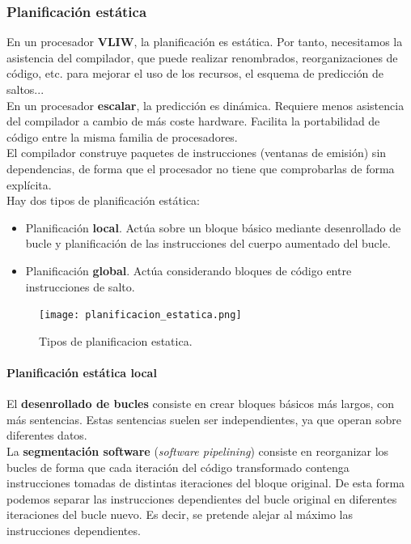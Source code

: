 \documentclass[12pt,spanish]{article}
\begin{document}
\subsubsection{Planificación estática}

En un procesador \textbf{VLIW}, la planificación es estática. Por tanto, necesitamos la asistencia del compilador, que puede realizar renombrados, reorganizaciones de código, etc. para mejorar el uso de los recursos, el esquema de predicción de saltos...\\

En un procesador \textbf{escalar}, la predicción es dinámica. Requiere menos asistencia del compilador a cambio de más coste hardware. Facilita la portabilidad de código entre la misma familia de procesadores.\\

El compilador construye paquetes de instrucciones (ventanas de emisión) sin dependencias, de forma que el procesador no tiene que comprobarlas de forma explícita.\\

Hay dos tipos de planificación estática:

\begin{itemize}
	\item Planificación \textbf{local}. Actúa sobre un bloque básico mediante desenrollado de bucle y planificación de las instrucciones del cuerpo aumentado del bucle.
	\item Planificación \textbf{global}. Actúa considerando bloques de código entre instrucciones de salto.
\end{itemize}


\begin{figure}[H]
\centering
\texttt{[image: planificacion\_estatica.png]}
\caption{Tipos de planificacion estatica.}
\end{figure}

\paragraph{Planificación estática local\\}

El \textbf{desenrollado de bucles} consiste en crear bloques básicos más largos, con más sentencias. Estas sentencias suelen ser independientes, ya que operan sobre diferentes datos.\\

La \textbf{segmentación software} (\textit{software pipelining}) consiste en reorganizar los bucles de forma que cada iteración del código transformado contenga instrucciones tomadas de distintas iteraciones del bloque original. De esta forma podemos separar las instrucciones dependientes del bucle original en diferentes iteraciones del bucle nuevo. Es decir, se pretende alejar al máximo las instrucciones dependientes.\\
\end{document}
